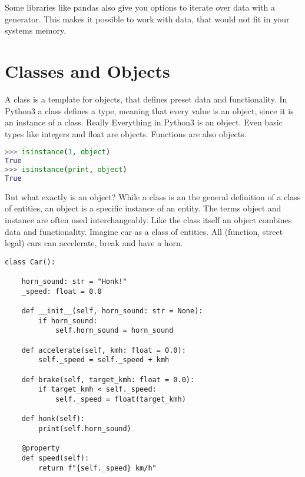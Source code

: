 \documentclass{article}
\begin{document}
Some libraries like pandas also give you options to iterate over data with a
generator.
This makes it possible to work with data, that would not fit in your
systems memory.

\section{Classes and Objects}

A class is a template for objects, that defines preset data and functionality.
In Python3 a class defines a type, meaning that every value is an object,
since it is an instance of a class.
Really Everything in Python3 is an object.
Even basic types like integers and float are objects.
Functions are also objects.

\begin{lstlisting}[language=python]
>>> isinstance(1, object)
True
>>> isinstance(print, object)
True
\end{lstlisting}

But what exactly is an object?
While a class is an the general definition of a class of entities, an object
is a specific instance of an entity.
The terms object and instance are often used interchangeably.
Like the class itself an object combines data and functionality.
Imagine car as a class of entities.
All (function, street legal) cars can accelerate, break and have a horn.

\begin{lstlisting}
class Car():

    horn_sound: str = "Honk!"
    _speed: float = 0.0

    def __init__(self, horn_sound: str = None):
        if horn_sound:
            self.horn_sound = horn_sound

    def accelerate(self, kmh: float = 0.0):
        self._speed = self._speed + kmh

    def brake(self, target_kmh: float = 0.0):
        if target_kmh < self._speed:
            self._speed = float(target_kmh)

    def honk(self):
        print(self.horn_sound)

    @property
    def speed(self):
        return f"{self._speed} km/h"


\end{lstlisting}
\end{document}

